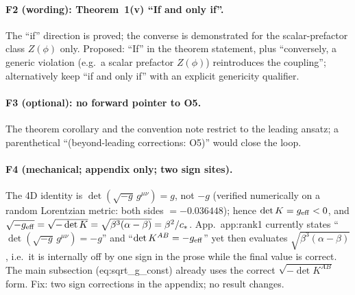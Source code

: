 \paragraph{F2 (wording): Theorem~1(v) ``If and only if''.}
The ``if'' direction is proved; the converse is demonstrated for
the scalar-prefactor class $Z(\phi)$ only. Proposed: ``If'' in
the theorem statement, plus ``conversely, a generic violation
(e.g.\ a scalar prefactor $Z(\phi)$) reintroduces the
coupling''; alternatively keep ``if and only if'' with an
explicit genericity qualifier.

\paragraph{F3 (optional): no forward pointer to O5.} The theorem
corollary and the convention note restrict to the leading
ansatz; a parenthetical ``(beyond-leading corrections: O5)''
would close the loop.

\paragraph{F4 (mechanical; appendix only; two sign sites).}
The 4D identity is $\det(\sqrt{-g}\,g^{\mu\nu})=g$, not $-g$
(verified numerically on a random Lorentzian metric: both sides
$=-0.036448$); hence $\det K=g_{\rm eff}<0$, and
$\sqrt{-g_{\rm eff}}=\sqrt{-\det K}=\sqrt{\beta^3(\alpha-\beta)}
=\beta^2/c_*$. App.~app:rank1 currently states
``$\det(\sqrt{-g}\,g^{\mu\nu})=-g$'' and
``$\det K^{AB}=-g_{\rm eff}$'' yet then evaluates
$\sqrt{\beta^3(\alpha-\beta)}$, i.e.\ it is internally off by one
sign in the prose while the final value is correct. The main
subsection (eq:sqrt\_g\_const) already uses the correct
$\sqrt{-\det K^{AB}}$ form. Fix: two sign corrections in the
appendix; no result changes.

